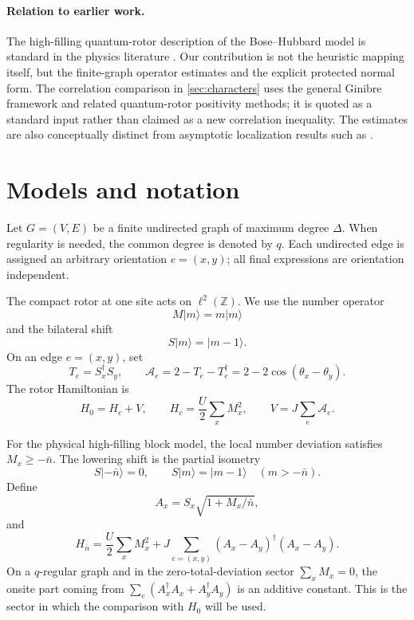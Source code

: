 \documentclass[11pt]{article}
\newcommand{\nbar}{\bar n}
\newcommand{\cA}{\mathcal A}
\begin{document}
\paragraph{Relation to earlier work.}
The high-filling quantum-rotor description of the Bose--Hubbard model is standard in the physics literature \cite{PolakKopec2007,Teichmann2009}. Our contribution is not the heuristic mapping itself, but the finite-graph operator estimates and the explicit protected normal form. The correlation comparison in \cref{sec:characters} uses the general Ginibre framework \cite{Ginibre1970,FrohlichPark1978,Miyao2016} and related quantum-rotor positivity methods; it is quoted as a standard input rather than claimed as a new correlation inequality. The estimates are also conceptually distinct from asymptotic localization results such as \cite{BolsDeRoeck2018}.

\section{Models and notation}

Let $G=(V,E)$ be a finite undirected graph of maximum degree $\Delta$. When regularity is needed, the common degree is denoted by $q$. Each undirected edge is assigned an arbitrary orientation $e=(x,y)$; all final expressions are orientation independent.

The compact rotor at one site acts on $\ell^2(\mathbb Z)$. We use the number operator
\[
M\lvert m\rangle=m\lvert m\rangle
\]
and the bilateral shift
\[
S\lvert m\rangle=\lvert m-1\rangle.
\]
On an edge $e=(x,y)$, set
\begin{equation}
T_e=S_x^\dagger S_y,
\qquad
\cA_e=2-T_e-T_e^\dagger=2-2\cos(\theta_x-\theta_y).
\label{eq:Aedge}
\end{equation}
The rotor Hamiltonian is
\begin{equation}
H_0=H_c+V,
\qquad
H_c=\frac U2\sum_x M_x^2,
\qquad
V=J\sum_e\cA_e.
\label{eq:H0}
\end{equation}

For the physical high-filling block model, the local number deviation satisfies $M_x\ge-\nbar$. The lowering shift is the partial isometry
\[
S\lvert-\nbar\rangle=0,
\qquad
S\lvert m\rangle=\lvert m-1\rangle\quad(m>-\nbar).
\]
Define
\begin{equation}
A_x=S_x\sqrt{1+M_x/\nbar},
\label{eq:Ax}
\end{equation}
and
\begin{equation}
H_{\nbar}=\frac U2\sum_xM_x^2
+J\sum_{e=(x,y)}(A_x-A_y)^\dagger(A_x-A_y).
\label{eq:Hn}
\end{equation}
On a $q$-regular graph and in the zero-total-deviation sector $\sum_xM_x=0$, the onsite part coming from $\sum_e(A_x^\dagger A_x+A_y^\dagger A_y)$ is an additive constant. This is the sector in which the comparison with $H_0$ will be used.
\end{document}
